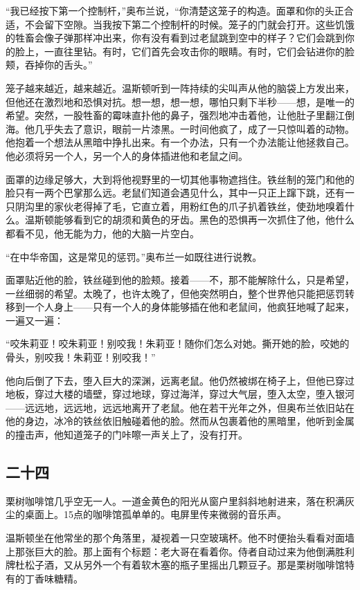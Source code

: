``我已经按下第一个控制杆，''奥布兰说，``你清楚这笼子的构造。面罩和你的头正合适，不会留下空隙。当我按下第二个控制杆的时候。笼子的门就会打开。这些饥饿的牲畜会像子弹那样冲出来，你有没有看到过老鼠跳到空中的样子？它们会跳到你的脸上，一直往里钻。有时，它们首先会攻击你的眼睛。有时，它们会钻进你的脸颊，吞掉你的舌头。''

笼子越来越近，越来越近。温斯顿听到一阵持续的尖叫声从他的脑袋上方发出来，但他还在激烈地和恐惧对抗。想一想，想一想，哪怕只剩下半秒------想，是唯一的希望。突然，一股牲畜的霉味直扑他的鼻子，强烈地冲击着他，让他肚子里翻江倒海。他几乎失去了意识，眼前一片漆黑。一时间他疯了，成了一只惊叫着的动物。他抱着一个想法从黑暗中挣扎出来。有一个办法，只有一个办法能让他拯救自己。他必须将另一个人，另一个人的身体插进他和老鼠之间。

面罩的边缘足够大，大到将他视野里的一切其他事物遮挡住。铁丝制的笼门和他的脸只有一两个巴掌那么远。老鼠们知道会遇见什么，其中一只正上蹿下跳，还有一只阴沟里的家伙老得掉了毛，它直立着，用粉红色的爪子扒着铁丝，使劲地嗅着什么。温斯顿能够看到它的胡须和黄色的牙齿。黑色的恐惧再一次抓住了他，他什么都看不见，他无能为力，他的大脑一片空白。

``在中华帝国，这是常见的惩罚。''奥布兰一如既往进行说教。

面罩贴近他的脸，铁丝碰到他的脸颊。接着------不，那不能解除什么，只是希望，一丝细弱的希望。太晚了，也许太晚了，但他突然明白，整个世界他只能把惩罚转移到一个人身上------只有一个人的身体能够插在他和老鼠间，他疯狂地喊了起来，一遍又一遍：

``咬朱莉亚！咬朱莉亚！别咬我！朱莉亚！随你们怎么对她。撕开她的脸，咬她的骨头，别咬我！朱莉亚！别咬我！''

他向后倒了下去，堕入巨大的深渊，远离老鼠。他仍然被绑在椅子上，但他已穿过地板，穿过大楼的墙壁，穿过地球，穿过海洋，穿过大气层，堕入太空，堕入银河------远远地，远远地，远远地离开了老鼠。他在若干光年之外，但奥布兰依旧站在他的身边，冰冷的铁丝依旧触碰着他的脸。然而从包裹着他的黑暗里，他听到金属的撞击声，他知道笼子的门咔嚓一声关上了，没有打开。

\subsection{二十四}\label{ux4e8cux5341ux56db}

栗树咖啡馆几乎空无一人。一道金黄色的阳光从窗户里斜斜地射进来，落在积满灰尘的桌面上。15点的咖啡馆孤单单的。电屏里传来微弱的音乐声。

温斯顿坐在他常坐的那个角落里，凝视着一只空玻璃杯。他不时便抬头看看对面墙上那张巨大的脸。那上面有个标题：老大哥在看着你。侍者自动过来为他倒满胜利牌杜松子酒，又从另外一个有着软木塞的瓶子里摇出几颗豆子。那是栗树咖啡馆特有的丁香味糖精。

